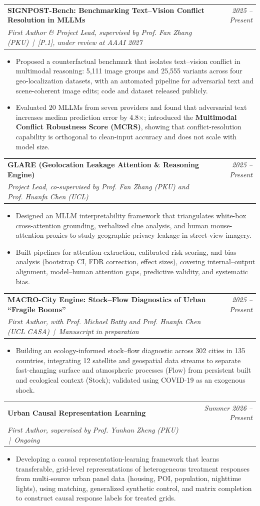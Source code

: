 \documentclass[a4paper,11pt]{article}
\makeatletter
\newcommand{\resumeProject}[4]{
\vspace{0.5mm}\item
    \begin{tabular*}{0.98\textwidth}[t]{l@{\extracolsep{\fill}}r}
        \textbf{#1} & \textit{\footnotesize{#3}} \\
        \footnotesize{\textit{#2}} & \footnotesize{#4}
    \end{tabular*}
    \vspace{-2.4mm}
}
\newcommand{\resumeItemListStart}{\begin{itemize}[leftmargin=*,labelsep=1mm,itemsep=0.5mm]}
\newcommand{\resumeItemListEnd}{\end{itemize}\vspace{-2mm}}
\makeatother
\begin{document}
\resumeProject
  {SIGNPOST-Bench: Benchmarking Text--Vision Conflict Resolution in MLLMs}
  {First Author \& Project Lead, supervised by Prof. Fan Zhang (PKU) \,|\, [P.1], under review at AAAI 2027}
  {2025 -- Present}
  {{}}
\resumeItemListStart
  \item Proposed a counterfactual benchmark that isolates text--vision conflict in multimodal reasoning: 5,111 image groups and 25,555 variants across four geo-localization datasets, with an automated pipeline for adversarial text and scene-coherent image edits; code and dataset released publicly.
  \item Evaluated 20 MLLMs from seven providers and found that adversarial text increases median prediction error by 4.8$\times$; introduced the \textbf{Multimodal Conflict Robustness Score (MCRS)}, showing that conflict-resolution capability is orthogonal to clean-input accuracy and does not scale with model size.
\resumeItemListEnd

\resumeProject
  {GLARE (Geolocation Leakage Attention \& Reasoning Engine)}
  {Project Lead, co-supervised by Prof. Fan Zhang (PKU) and Prof. Huanfa Chen (UCL)}
  {2025 -- Present}
  {{}}
\resumeItemListStart
  \item Designed an MLLM interpretability framework that triangulates white-box cross-attention grounding, verbalized clue analysis, and human mouse-attention proxies to study geographic privacy leakage in street-view imagery.
  \item Built pipelines for attention extraction, calibrated risk scoring, and bias analysis (bootstrap CI, FDR correction, effect sizes), covering internal--output alignment, model--human attention gaps, predictive validity, and systematic bias.
\resumeItemListEnd

\resumeProject
  {MACRO-City Engine: Stock--Flow Diagnostics of Urban ``Fragile Booms''}
  {First Author, with Prof. Michael Batty and Prof. Huanfa Chen (UCL CASA) \,|\, Manuscript in preparation}
  {2025 -- Present}
  {{}}
\resumeItemListStart
  \item Building an ecology-informed stock--flow diagnostic across 302 cities in 135 countries, integrating 12 satellite and geospatial data streams to separate fast-changing surface and atmospheric processes (Flow) from persistent built and ecological context (Stock); validated using COVID-19 as an exogenous shock.
\resumeItemListEnd

\resumeProject
  {Urban Causal Representation Learning}
  {First Author, supervised by Prof. Yunhan Zheng (PKU) \,|\, Ongoing}
  {Summer 2026 -- Present}
  {{}}
\resumeItemListStart
  \item Developing a causal representation-learning framework that learns transferable, grid-level representations of heterogeneous treatment responses from multi-source urban panel data (housing, POI, population, nighttime lights), using matching, generalized synthetic control, and matrix completion to construct causal response labels for treated grids.
\resumeItemListEnd
\end{document}
